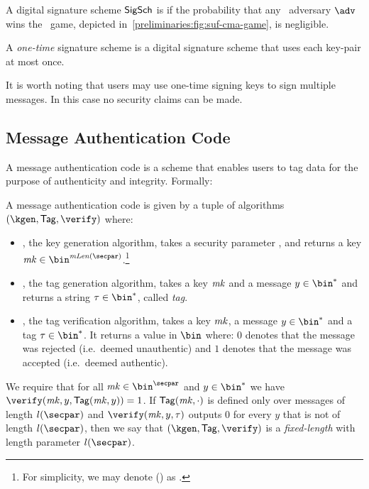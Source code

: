 \begin{definition}\label{preliminaries:def:sufcma}
A digital signature scheme $\mathsf{SigSch}$ is \sufcma{} if the probability that any \ppt~adversary $\adv$ wins the \sufcma~game, depicted in~\cref{preliminaries:fig:suf-cma-game}, is negligible.
\end{definition}

\begin{definition}\label{preliminaries:def:ot-sig}
    A \emph{one-time} signature scheme is a digital signature scheme that uses each key-pair at most once.
\end{definition}

\begin{remark}
    It is worth noting that users may use one-time signing keys to sign multiple messages. In this case no security claims can be made.
\end{remark}
\subsection{Message Authentication Code}
A message authentication code is a scheme that enables users to tag data for the purpose of authenticity and integrity. Formally:

\begin{definition}
A message authentication code \mac{} is given by a tuple of \ppt{} algorithms $(\kgen,\tagg, \verify)$ where:
    \begin{itemize}
        \item \kgen{}, the key generation algorithm, takes a security parameter \secparam{}, and returns a key $\mk \in \bin^{\macKeyLen(\secpar)}$.\footnote{For simplicity, we may denote \macKeyLen(\secpar) as \macKeyLen{}.}
        \item \tagg{}, the tag generation algorithm, takes a key $\mathit{mk}$ and a message $ y\in\bin^{*} $ and returns a string $\tau\in\bin^{*}$, called \emph{tag}.
        \item  \verify{}, the tag verification algorithm, takes a key $\mathit{mk}$, a message $ y \in \bin^{*} $ and a tag $\tau \in \bin^{*}$. It returns a value in $\bin$ where: $0$ denotes that the message was rejected (i.e.~deemed unauthentic) and $1$ denotes that the message was accepted (i.e.~deemed authentic).
    \end{itemize}
    We require that for all $\mk \in \bin^{\secpar}$ and $y \in \bin^{*}$ we have $\verify(\mk, y, \tagg(\mk,y)) = 1$. If $\mathsf{Tag}(\mathit{mk},\cdot)$ is defined only over messages of length $l(\secpar)$ and $\verify(\mk,y,\tau)$ outputs $0$ for every $y$ that is not of length $l(\secpar)$, then we say that $(\kgen,\tagg, \verify)$ is a \emph{fixed-length} \mac{} with length parameter $l(\secpar)$.
\end{definition}

